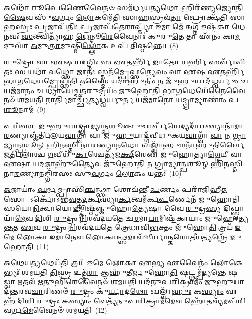 𑌅𑌥𑍋᳴ \ul{𑌰𑍂}\-𑌪𑍇\-\ul{𑌣𑍈}\-𑌵𑍈\-\ul{𑌨}\-\-\ul{𑍞} 𑌸𑌮᳴𑌰𑍍𑌧\-\ul{𑌯}\-𑌤𑍍𑌯\-\ul{𑌥𑍋} 𑌹𑌿𑌰᳴𑌣𑍍𑌯𑌜𑍍𑌯𑍋𑌤𑌿\-\ul{𑌷𑍈}\-𑌵 𑌸𑍁᳴\-\ul{𑌵}\-𑌰𑍍𑌗𑌂 \ul{𑌲𑍋}\-𑌕𑌮𑍇᳴𑌤𑌿 𑌸𑌾\-\ul{𑌹}\-𑌸𑍍𑌰𑌵᳴\-\ul{𑌤𑌾} 𑌪𑍍𑌰𑍋𑌕𑍍𑌷᳴𑌤𑌿 𑌸𑌾\-\ul{𑌹}\-𑌸𑍍𑌰𑌃 \ul{𑌪𑍍𑌰}\-𑌜𑌾𑌪᳴𑌤𑌿𑌃 \ul{𑌪𑍍𑌰}\-𑌜𑌾𑌪᳴\-\ul{𑌤𑍇}\-𑌰𑌾𑌪𑍍𑌤𑍍𑌯𑌾᳴ \ul{𑌇}\-𑌮𑌾 𑌮𑍇᳴ 𑌅\-\ul{𑌗𑍍𑌨} 𑌇𑌷𑍍𑌟᳴𑌕𑌾 \ul{𑌧𑍇}\-𑌨𑌵𑌃᳴ \ul{𑌸}\-𑌨𑍍𑌤𑍍𑌵𑌿𑌤𑍍𑌯𑌾᳴𑌹 \ul{𑌧𑍇}\-𑌨𑍂\-\ul{𑌰𑍇}\-𑌵𑍈𑌨𑌾𑌃॑ 𑌕𑍁𑌰𑍁\-\ul{𑌤𑍇} 𑌤𑌾 𑌏᳴𑌨𑌂 𑌕𑌾\-\ul{𑌮}\-𑌦𑍁𑌘𑌾᳴ \ul{𑌅}\-𑌮𑍁\-\ul{𑌤𑍍𑌰𑌾}\-𑌮𑍁𑌷𑍍𑌮𑌿᳴\-\ul{𑌲𑍍𑌲𑍋𑌁}\-𑌕 𑌉𑌪᳴ 𑌤𑌿𑌷𑍍𑌠𑌨𑍍𑌤𑍇॥~(8)

{\anuvakamend[{𑌸𑌯𑍋᳴𑌨𑌿\-\ul{𑌮𑍇}\-𑌤𑌾 𑌵𑍈 𑌕᳴\-\ul{𑌰𑍋}\-𑌤𑍍𑌯𑍇\-\ul{𑌕𑌾}\-𑌨𑍍𑌨𑌚᳴𑌤𑍍𑌵𑌾\-\ul{𑌰𑌿}\-\-\ul{𑍞}\-𑌶𑌚𑍍𑌚᳴}]}%

\-\ul{𑌰𑍁}\-𑌦𑍍𑌰𑍋 𑌵𑌾 \ul{𑌏}\-𑌷 𑌯\-\ul{𑌦}\-𑌗𑍍𑌨𑌿𑌃 𑌸 \ul{𑌏}\-𑌤𑌰𑍍\mbox{}𑌹𑌿᳴ \ul{𑌜𑌾}\-𑌤𑍋 𑌯𑌰𑍍\mbox{}\-\ul{𑌹𑌿} 𑌸𑌰𑍍𑌵᳴\-\ul{𑌶𑍍𑌚𑌿}\-𑌤𑌃 𑌸 𑌯𑌥𑌾᳴ \ul{𑌵}\-𑌥𑍍𑌸𑍋 \ul{𑌜𑌾}\-𑌤𑌃 𑌸𑍍𑌤𑌨᳴\-\ul{𑌮𑍍𑌪𑍍𑌰𑍇}\-𑌫𑍍𑌸\-\ul{𑌤𑍍𑌯𑍇}\-𑌵𑌂 𑌵𑌾 \ul{𑌏}\-𑌷 \ul{𑌏}\-𑌤𑌰𑍍\mbox{}𑌹𑌿᳴ 𑌭𑌾\-\ul{𑌗}\-𑌧𑍇\-\ul{𑌯}\-𑌮𑍍𑌪𑍍𑌰𑍇𑌫𑍍𑌸᳴\-\ul{𑌤𑌿} 𑌤\-\ul{𑌸𑍍𑌮𑍈} 𑌯𑌦𑌾𑌹𑍁᳴\-\ul{𑌤𑌿𑌂} 𑌨 𑌜𑍁᳴\-\ul{𑌹𑍁}\-𑌯𑌾𑌦᳴\-\ul{𑌧𑍍𑌵}\-𑌰𑍍𑌯𑍁𑌂 \ul{𑌚} 𑌯𑌜᳴𑌮𑌾𑌨𑌂 𑌚 𑌧𑍍𑌯𑌾𑌯𑍇𑌚𑍍𑌛𑌤\-\ul{𑌰𑍁}\-𑌦𑍍𑌰𑍀𑌯𑌂᳴ 𑌜𑍁𑌹𑍋𑌤𑌿 𑌭𑌾\-\ul{𑌗}\-𑌧𑍇𑌯𑍇᳴\-\ul{𑌨𑍈}\-𑌵𑍈𑌨𑍞᳴ 𑌶𑌮𑌯\-\ul{𑌤𑌿} 𑌨𑌾\-\ul{𑌰𑍍𑌤𑌿}\-𑌮𑌾𑌰𑍍𑌚𑍍𑌛᳴𑌤𑍍𑌯\-\ul{𑌧𑍍𑌵}\-𑌰𑍍𑌯𑍁𑌰𑍍𑌨 𑌯𑌜᳴𑌮𑌾\-\ul{𑌨𑍋} 𑌯\-\ul{𑌦𑍍𑌗𑍍𑌰𑌾}\-𑌮𑍍𑌯𑌾𑌣𑌾𑌂॑ 𑌪\-\ul{𑌶𑍂}\-𑌨𑌾𑌮𑍍~(9)

𑌪𑌯᳴𑌸𑌾 𑌜𑍁\-\ul{𑌹𑍁}\-𑌯𑌾\-\ul{𑌦𑍍𑌗𑍍𑌰𑌾}\-𑌮𑍍𑌯𑌾\-\ul{𑌨𑍍𑌪}\-𑌶𑍂\-\ul{𑌞𑍍𑌛𑍁}\-𑌚𑌾𑌰𑍍𑌪᳴\-\ul{𑌯𑍇}\-𑌦𑍍𑌯𑌦𑌾᳴\-\ul{𑌰}\-𑌣𑍍𑌯𑌾𑌨𑌾᳴𑌮𑌾\-\ul{𑌰}\-𑌣𑍍𑌯𑌾𑌞𑍍𑌜᳴𑌰𑍍𑌤𑌿𑌲𑌯\-\ul{𑌵𑌾}\-𑌗𑍍𑌵𑌾᳴ 𑌵𑌾 𑌜𑍁\-\ul{𑌹𑍁}\-𑌯𑌾𑌦𑍍𑌗᳴𑌵𑍀𑌧𑍁𑌕𑌯\-\ul{𑌵𑌾}\-𑌗𑍍𑌵𑌾᳴ \ul{𑌵𑌾} 𑌨 \ul{𑌗𑍍𑌰𑌾}\-𑌮𑍍𑌯𑌾\-\ul{𑌨𑍍𑌪}\-𑌶𑍂𑌨𑍍 \ul{𑌹𑌿}\-𑌨\-\ul{𑌸𑍍𑌤𑌿} 𑌨𑌾\-\ul{𑌰}\-𑌣𑍍𑌯𑌾𑌨\-\ul{𑌥𑍋} 𑌖𑌲𑍍𑌵𑌾᳴\-\ul{𑌹𑍁}\-𑌰𑌨𑌾᳴𑌹𑍁\-\ul{𑌤𑌿}\-𑌰𑍍𑌵𑍈 \ul{𑌜}\-𑌰𑍍𑌤𑌿𑌲𑌾॑𑌶𑍍𑌚 \ul{𑌗}\-𑌵𑍀𑌧𑍁᳴\-\ul{𑌕𑌾}\-𑌶𑍍𑌚𑍇𑌤𑍍𑌯᳴𑌜\-\ul{𑌕𑍍𑌷𑍀}\-𑌰𑍇𑌣᳴ 𑌜𑍁𑌹𑍋𑌤𑍍𑌯𑌾\-\ul{𑌗𑍍𑌨𑍇}\-𑌯𑍀 𑌵𑌾 \ul{𑌏}\-𑌷𑌾 𑌯\-\ul{𑌦}\-𑌜𑌾𑌹𑍁᳴\-\ul{𑌤𑍍𑌯𑍈}\-𑌵 𑌜𑍁᳴𑌹𑍋\-\ul{𑌤𑌿} 𑌨 \ul{𑌗𑍍𑌰𑌾}\-𑌮𑍍𑌯𑌾\-\ul{𑌨𑍍𑌪}\-𑌶𑍂𑌨𑍍 \ul{𑌹𑌿}\-𑌨\-\ul{𑌸𑍍𑌤𑌿} 𑌨𑌾\-\ul{𑌰}\-𑌣𑍍𑌯𑌾𑌨𑌙𑍍𑌗𑌿᳴𑌰𑌸𑌃 𑌸𑍁\-\ul{𑌵}\-𑌰𑍍𑌗𑌂 \ul{𑌲𑍋}\-𑌕𑌂 𑌯𑌨𑍍𑌤𑌃᳴~(10)

\-\ul{𑌅}\-𑌜𑌾𑌯𑌾𑌂॑ \ul{𑌘}\-𑌰𑍍𑌮𑌮𑍍𑌪𑍍𑌰𑌾𑌸𑌿᳴\-\ul{𑌞𑍍𑌚}\-𑌨𑍍𑌥𑍍𑌸𑌾 𑌶𑍋𑌚᳴𑌨𑍍𑌤𑍀 \ul{𑌪}\-𑌰𑍍𑌣𑌂 𑌪𑌰𑌾᳴𑌜𑌿𑌹𑍀\-\ul{𑌤} 𑌸𑍋 \-𑌽𑌰𑍍𑌕𑍋᳴\-𑌽𑌭\-\ul{𑌵}\-𑌤𑍍𑌤\-\ul{𑌦}\-𑌰𑍍𑌕𑌸𑍍𑌯𑌾॑\-\ul{𑌰𑍍𑌕}\-𑌤𑍍𑌵𑌮᳴𑌰𑍍𑌕\-\ul{𑌪}\-𑌰𑍍𑌣𑍇𑌨᳴ 𑌜𑍁𑌹𑍋𑌤𑌿 𑌸𑌯𑍋\-\ul{𑌨𑌿}\-𑌤𑍍𑌵𑌾𑌯𑍋\-\ul{𑌦}\-𑌙𑍍𑌤𑌿𑌷𑍍𑌠᳴𑌞𑍍𑌜𑍁𑌹𑍋\-\ul{𑌤𑍍𑌯𑍇}\-𑌷𑌾 𑌵𑍈 \ul{𑌰𑍁}\-𑌦𑍍𑌰\-\ul{𑌸𑍍𑌯} 𑌦𑌿𑌖𑍍𑌸𑍍𑌵𑌾𑌯𑌾᳴\-\ul{𑌮𑍇}\-𑌵 \ul{𑌦𑌿}\-𑌶𑌿 \ul{𑌰𑍁}\-𑌦𑍍𑌰𑌂 \ul{𑌨𑌿}\-𑌰𑌵᳴𑌦𑌯𑌤𑍇 𑌚\-\ul{𑌰}\-𑌮𑌾\-\ul{𑌯𑌾}\-𑌮𑌿𑌷𑍍𑌟᳴𑌕𑌾𑌯𑌾𑌂 𑌜𑍁𑌹𑍋𑌤𑍍𑌯\-\ul{𑌨𑍍𑌤}\-𑌤 \ul{𑌏}\-𑌵 \ul{𑌰𑍁}\-𑌦𑍍𑌰𑌂 \ul{𑌨𑌿}\-𑌰𑌵᳴𑌦𑌯𑌤𑍇 𑌤𑍍𑌰𑍇𑌧𑌾𑌵𑌿\-\ul{𑌭}\-𑌕𑍍𑌤𑌂 𑌜𑍁᳴𑌹𑍋\-\ul{𑌤𑌿} 𑌤𑍍𑌰𑌯᳴ \ul{𑌇}\-𑌮𑍇 \ul{𑌲𑍋}\-𑌕𑌾 \ul{𑌇}\-𑌮𑌾\-\ul{𑌨𑍇}\-𑌵 \ul{𑌲𑍋}\-𑌕𑌾\-\ul{𑌨𑍍𑌥𑍍𑌸}\-𑌮𑌾𑌵᳴𑌦𑍍𑌵𑍀𑌰𑍍𑌯𑌾𑌨𑍍𑌕\-\ul{𑌰𑍋}\-𑌤𑍀\-\ul{𑌯}\-𑌤𑍍𑌯𑌗𑍍𑌰𑍇᳴ 𑌜𑍁𑌹𑍋𑌤𑌿~(11)

𑌅𑌥𑍇\-\ul{𑌯}\-𑌤𑍍𑌯𑌥𑍇𑌯᳴\-\ul{𑌤𑌿} 𑌤𑍍𑌰𑌯᳴ \ul{𑌇}\-𑌮𑍇 \ul{𑌲𑍋}\-𑌕𑌾 \ul{𑌏}\-𑌭𑍍𑌯 \ul{𑌏}\-𑌵𑍈𑌨𑌂᳴ \ul{𑌲𑍋}\-𑌕𑍇𑌭𑍍𑌯𑌃᳴ 𑌶𑌮𑌯𑌤𑌿 \ul{𑌤𑌿}\-𑌸𑍍𑌰 𑌉𑌤𑍍𑌤᳴\-\ul{𑌰𑌾} 𑌆𑌹𑍁᳴𑌤𑍀𑌰𑍍𑌜𑍁𑌹𑍋\-\ul{𑌤𑌿} 𑌷𑌟𑍍𑌥𑍍𑌸𑌮𑍍𑌪᳴\-\ul{𑌦𑍍𑌯}\-𑌨𑍍𑌤𑍇 𑌷𑌡𑍍𑌵𑌾 \ul{𑌋}\-𑌤𑌵᳴ \ul{𑌋}\-𑌤𑍁𑌭𑌿᳴\-\ul{𑌰𑍇}\-𑌵𑍈𑌨𑍞᳴ 𑌶𑌮𑌯\-\ul{𑌤𑌿} 𑌯𑌦᳴𑌨𑍁𑌪\-\ul{𑌰𑌿}\-𑌕𑍍𑌰𑌾𑌮𑌂᳴ 𑌜𑍁\-\ul{𑌹𑍁}\-𑌯𑌾𑌦᳴𑌨𑍍𑌤𑌰𑌵\-\ul{𑌚𑌾}\-𑌰𑌿𑌣𑍞᳴ \ul{𑌰𑍁}\-𑌦𑍍𑌰𑌂 𑌕𑍁᳴\-\ul{𑌰𑍍𑌯𑌾}\-𑌦\-\ul{𑌥𑍋} 𑌖𑌲𑍍𑌵𑌾᳴\-\ul{𑌹𑍁𑌃} 𑌕\-\ul{𑌸𑍍𑌯𑌾𑌂} 𑌵𑌾𑌹᳴ \ul{𑌦𑌿}\-𑌶𑌿 \ul{𑌰𑍁}\-𑌦𑍍𑌰𑌃 𑌕\-\ul{𑌸𑍍𑌯𑌾𑌂} 𑌵𑍇𑌤𑍍𑌯᳴𑌨𑍁𑌪\-\ul{𑌰𑌿}\-𑌕𑍍𑌰𑌾𑌮᳴\-\ul{𑌮𑍇}\-𑌵 𑌹𑍋᳴\-\ul{𑌤}\-𑌵𑍍𑌯᳴𑌮𑌪᳴𑌰𑌿𑌵𑌰𑍍𑌗\-\ul{𑌮𑍇}\-𑌵𑍈𑌨𑍞᳴ 𑌶𑌮𑌯𑌤𑌿~(12)

